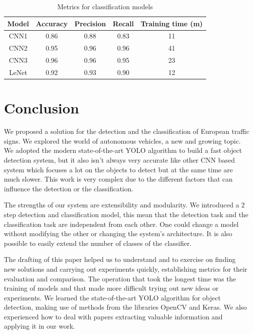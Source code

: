 \documentclass[10pt,twocolumn,letterpaper]{article}
\begin{document}
\begin{table}[h!]
	\begin{center}
		\begin{tabular}{|c|c|c|c|c|}
			\hline
			Model & Accuracy & Precision & Recall & Training time (m) \\
			\hline\hline
			CNN1 & 0.86 & 0.88 & 0.83 & 11 \\
			CNN2 & 0.95 & 0.96 & 0.96 & 41 \\
			CNN3 & 0.96 & 0.96 & 0.95 & 23 \\
			LeNet & 0.92 & 0.93 & 0.90 & 12 \\
			\hline
		\end{tabular}
	\end{center}
	\caption{Metrics for classification models}
	\label{class-metrics}
\end{table}
\section{Conclusion}
We proposed a solution for the detection and the classification of European traffic signs. We explored the world of autonomous vehicles, a new and growing topic. We adopted the modern state-of-the-art YOLO algorithm to build a fast object detection system, but it also isn't always very accurate like other CNN based system which focuses a lot on the objects to detect but at the same time are much slower. This work is very complex due to the different factors that can influence the detection or the classification.

The strengths of our system are extensibility and modularity. We introduced a 2 step detection and classification model, this mean that the detection task and the classification task are independent from each other. One could change a model without modifying the other or changing the system's architecture. It is also possible to easily extend the number of classes of the classifier.

The drafting of this paper helped us to understand and to exercise on finding new solutions and carrying out experiments quickly, establishing metrics for their evaluation and comparison. The operation that took the longest time was the training of models and that made more difficult trying out new ideas or experiments. We learned the state-of-the-art YOLO algorithm for object detection, making use of methods from the libraries OpenCV and Keras. We also experienced how to deal with papers extracting valuable information and applying it in our work.
\end{document}
